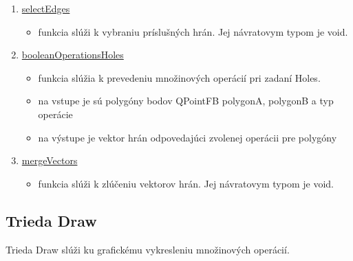 \documentclass[12pt]{article}
\begin{document}
\begin{enumerate}
\item[] \underline{selectEdges}
\begin{itemize}
\item funkcia slúži k vybraniu príslušných hrán. Jej návratovym typom je void. 
\end{itemize}


\item[] \underline{booleanOperationsHoles}
\begin{itemize}
\item funkcia slúžia k prevedeniu množinových operácií pri zadaní Holes. 
\item na vstupe je sú polygóny bodov QPointFB polygonA, polygonB a typ operácie 
\item na výstupe je vektor hrán odpovedajúci zvolenej operácii pre polygóny
\end{itemize}


\item[] \underline{mergeVectors}
\begin{itemize}
\item funkcia slúži k zlúčeniu vektorov hrán. Jej návratovym typom je void. 
\end{itemize}
\end{enumerate}

\subsection{Trieda Draw}
Trieda Draw slúži ku grafickému vykresleniu množinových operácií.
\end{document}
